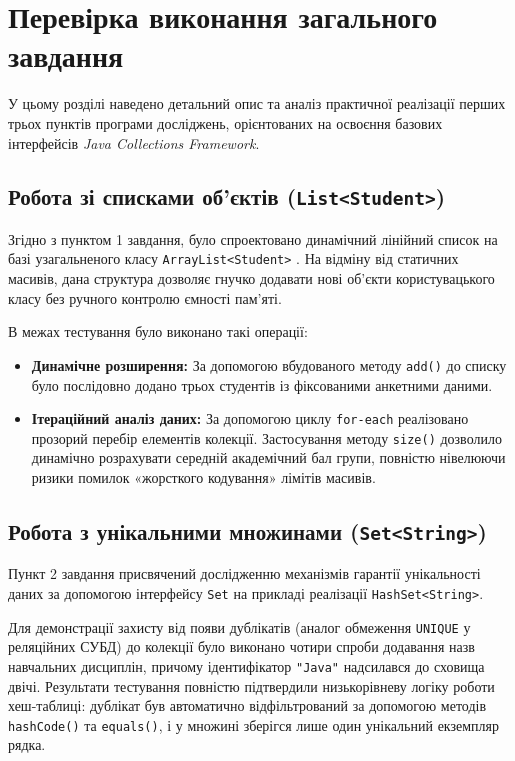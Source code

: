 \section{Перевірка виконання загального завдання}

У цьому розділі наведено детальний опис та аналіз практичної реалізації 
перших трьох пунктів програми досліджень, орієнтованих на освоєння базових 
інтерфейсів \textit{Java Collections Framework}.

\subsection{Робота зі списками об'єктів (\texttt{List<Student>})}

Згідно з пунктом 1 завдання, було спроектовано динамічний лінійний список 
на базі узагальненого класу \texttt{ArrayList<Student>}
. На відміну 
від статичних масивів, дана структура дозволяє гнучко додавати нові об'єкти 
користувацького класу без ручного контролю ємності пам'яті. 

В межах тестування було виконано такі операції:
\begin{itemize}
    \item \textbf{Динамічне розширення:} 
    За допомогою вбудованого методу \texttt{add()} до списку було послідовно 
    додано трьох студентів із фіксованими анкетними даними.
    \item \textbf{Ітераційний аналіз даних:} 
    За допомогою циклу \texttt{for-each} реалізовано прозорий перебір елементів 
    колекції. Застосування методу \texttt{size()} дозволило динамічно 
    розрахувати середній академічний бал групи, повністю нівелюючи ризики 
    помилок «жорсткого кодування» лімітів масивів.
\end{itemize}

\subsection{Робота з унікальними множинами (\texttt{Set<String>})}

Пункт 2 завдання присвячений дослідженню механізмів гарантії унікальності даних 
за допомогою інтерфейсу \texttt{Set} на прикладі реалізації \texttt{HashSet<String>}. 

Для демонстрації захисту від появи дублікатів (аналог обмеження \texttt{UNIQUE} 
у реляційних СУБД) до колекції було виконано чотири спроби додавання назв навчальних 
дисциплін, причому ідентифікатор \texttt{"Java"} надсилався до сховища двічі. 
Результати тестування повністю підтвердили низькорівневу логіку роботи хеш-таблиці: 
дублікат був автоматично відфільтрований за допомогою методів \texttt{hashCode()} 
та \texttt{equals()}, і у множині зберігся лише один унікальний екземпляр 
рядка.

